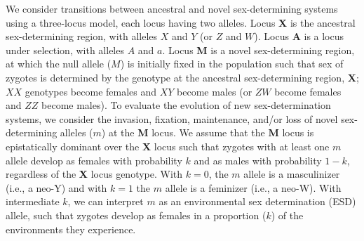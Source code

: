 \documentclass[12pt]{article}
\begin{document}
We consider transitions between ancestral and novel sex-determining systems using a three-locus model, each locus having two alleles. 
Locus \textbf{X} is the ancestral sex-determining region, with alleles $X$ and $Y$ (or $Z$ and $W$).
Locus \textbf{A} is a locus under selection, with alleles $A$ and $a$.
Locus \textbf{M} is a novel sex-determining region, at which the null allele ($M$) is initially fixed in the population such that sex of zygotes is determined by the genotype at the ancestral sex-determining region, \textbf{X}; $XX$ genotypes become females and $XY$ become males (or $ZW$ become females and $ZZ$ become males). 
To evaluate the evolution of new sex-determination systems, we consider the invasion, fixation, maintenance, and/or loss of novel sex-determining alleles ($m$) at the \textbf{M} locus. 
We assume that the \textbf{M} locus is epistatically dominant over the \textbf{X} locus such that zygotes with at least one $m$ allele develop as females with probability $k$ and as males with probability $1-k$, regardless of the \textbf{X} locus genotype.
With $k=0$, the $m$ allele is a masculinizer (i.e., a neo-Y) and with $k=1$ the $m$ allele is a feminizer (i.e., a neo-W).
With intermediate $k$, we can interpret $m$ as an environmental sex determination (ESD) allele, such that zygotes develop as females in a proportion ($k$) of the environments they experience. 
\end{document}
